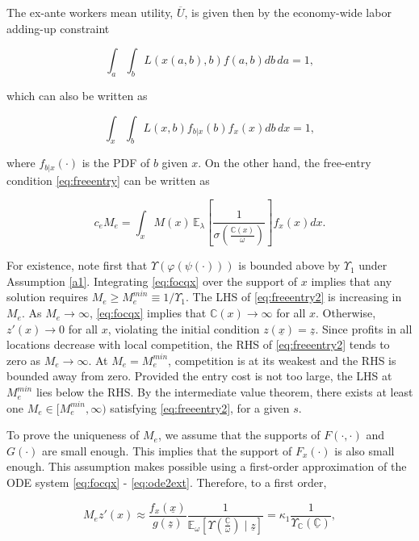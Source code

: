 The ex-ante workers mean utility, $\overline{U}$, is given then by the economy-wide labor adding-up constraint

\begin{equation*}
	\int_{a} \int_{b} L\left(x(a,b), b\right) f(a,b) db \, da = 1,
\end{equation*}

which can also be written as

\begin{equation*}
	\int_{x} \int_{b} L\left(x, b\right) f_{b | x} (b) f_x(x) db \, dx = 1,
\end{equation*}

where $f_{b |x}(\cdot)$ is the PDF of $b$ given $x$. On the other hand, the free-entry condition \eqref{eq:freeentry} can be written as 

\begin{equation}\label{eq:freeentry2}
	c_e M_e = \int_x M(x)\, \mathbb{E}_\lambda\left[\frac{1}{\sigma\left(\frac{\mathbb{C}(x)}{\omega}\right)}\right] f_x(x) dx.
\end{equation}

For existence, note first that $\Upsilon(\varphi(\psi(\cdot)))$ is bounded above by $\Upsilon_1$ under Assumption \ref{a1}. Integrating \eqref{eq:focqx} over the support of $x$ implies that any solution requires $M_e \geq M_e^{min} \equiv 1/\Upsilon_1$. The LHS of \eqref{eq:freeentry2} is increasing in $M_e$. As $M_e \to \infty$, \eqref{eq:focqx} implies that $\mathbb{C}(x) \to \infty$ for all $x$. Otherwise, $z'(x) \to 0$ for all $x$, violating the initial condition $z(\underline{x}) = \underline{z}$. Since profits in all locations decrease with local competition, the RHS of \eqref{eq:freeentry2} tends to zero as $M_e \to \infty$. At $M_e = M_e^{min}$, competition is at its weakest and the RHS is bounded away from zero. Provided the entry cost is not too large, the LHS at $M_e^{min}$ lies below the RHS. By the intermediate value theorem, there exists at least one $M_e \in [M_e^{min}, \infty)$ satisfying \eqref{eq:freeentry2}, for a given $s$.

To prove the uniqueness of $M_e$, we assume that the supports of $F(\cdot, \cdot)$ and $G(\cdot)$ are small enough. This implies that the support of $F_x(\cdot)$ is also small enough. This assumption makes possible using a first-order approximation of the ODE system \eqref{eq:focqx} - \eqref{eq:ode2ext}. Therefore, to a first order,

\begin{equation*}
	M_e z'(x) \approx \frac{f_x(\underline{x})}{g(\underline{z})} \frac{1}{\mathbb{E}_{\omega}\left[\Upsilon\left(\frac{\underline{\mathbb{C}}}{\omega}\right) \mid \underline{z}\right]} = \kappa_1 \frac{1}{\Upsilon_{\mathbb{C}}(\underline{\mathbb{C}})},
\end{equation*}

